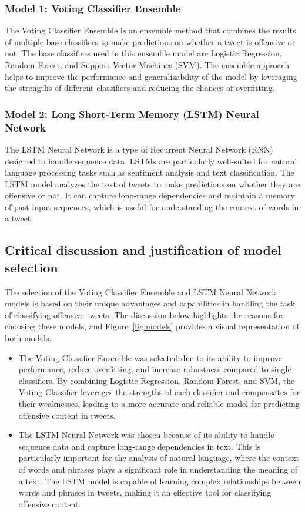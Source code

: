 \documentclass[11pt]{article}
\begin{document}
\subsubsection{Model 1: Voting Classifier Ensemble}
The Voting Classifier Ensemble is an ensemble method that combines the results of multiple base classifiers to make predictions on whether a tweet is offensive or not. The base classifiers used in this ensemble model are Logistic Regression, Random Forest, and Support Vector Machines (SVM). The ensemble approach helps to improve the performance and generalizability of the model by leveraging the strengths of different classifiers and reducing the chances of overfitting.
\subsubsection{Model 2: Long Short-Term Memory (LSTM) Neural Network}
The LSTM Neural Network is a type of Recurrent Neural Network (RNN) designed to handle sequence data. LSTMs are particularly well-suited for natural language processing tasks such as sentiment analysis and text classification. The LSTM model analyzes the text of tweets to make predictions on whether they are offensive or not. It can capture long-range dependencies and maintain a memory of past input sequences, which is useful for understanding the context of words in a tweet.
\subsection{Critical discussion and justification of model selection}
The selection of the Voting Classifier Ensemble and LSTM Neural Network models is based on their unique advantages and capabilities in handling the task of classifying offensive tweets. The discussion below highlights the reasons for choosing these models, and Figure~\ref{fig:models} provides a visual representation of both models.
\begin{itemize} \item The Voting Classifier Ensemble was selected due to its ability to improve performance, reduce overfitting, and increase robustness compared to single classifiers. By combining Logistic Regression, Random Forest, and SVM, the Voting Classifier leverages the strengths of each classifier and compensates for their weaknesses, leading to a more accurate and reliable model for predicting offensive content in tweets.
\item The LSTM Neural Network was chosen because of its ability to handle sequence data and capture long-range dependencies in text. This is particularly important for the analysis of natural language, where the context of words and phrases plays a significant role in understanding the meaning of a text. The LSTM model is capable of learning complex relationships between words and phrases in tweets, making it an effective tool for classifying offensive content. \end{itemize}
\end{document}

